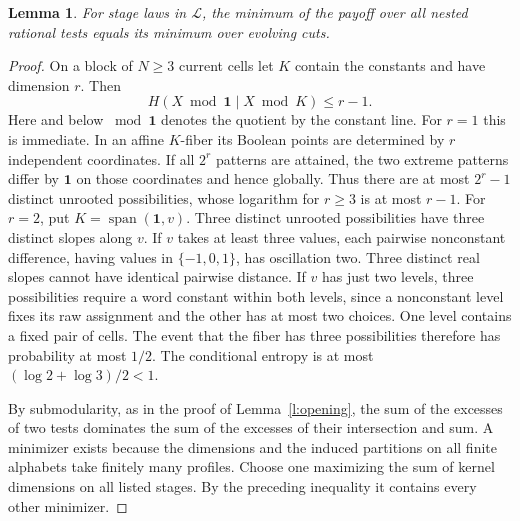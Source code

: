 \documentclass[11pt]{article}
\newtheorem{lemma}[theorem]{Lemma}
\numberwithin{equation}{section}
\newcommand{\one}{\mathbf 1}
\DeclareMathOperator{\spanop}{span}
\begin{document}
\begin{lemma}\label{l:cutmin}
For stage laws in $\mathcal L$, the minimum of the payoff over all
nested rational tests equals its minimum over evolving cuts.
\end{lemma}
\begin{proof}
On a block of $N\ge3$ current cells let $K$ contain the constants
and have dimension $r$. Then
\begin{equation}
 H(X\bmod\one\mid X\bmod K)\le r-1 . \label{e:fiber}
\end{equation}
Here and below $\bmod\one$ denotes the quotient by the constant line.
For $r=1$ this is immediate. In an affine $K$-fiber its Boolean
points are determined by $r$ independent coordinates. If all
$2^r$ patterns are attained, the two extreme patterns differ by
$\one$ on those coordinates and hence globally. Thus there are at
most $2^r-1$ distinct unrooted possibilities, whose logarithm
for $r\ge3$ is at most $r-1$. For $r=2$, put $K=\spanop(\one,v)$.
Three distinct unrooted possibilities have three distinct slopes
along $v$. If $v$ takes at least three values, each pairwise
nonconstant difference, having values in $\{-1,0,1\}$, has
oscillation two. Three distinct real slopes cannot have identical
pairwise distance. If $v$ has just two levels, three possibilities
require a word constant within both levels, since a nonconstant
level fixes its raw assignment and the other has at most two choices.
One level contains a fixed pair of cells. The event that the fiber
has three possibilities therefore has probability at most $1/2$.
The conditional entropy is at most $(\log2+\log3)/2<1$.

By submodularity, as in the proof of Lemma~\ref{l:opening}, the sum
of the excesses of two tests dominates the sum of the excesses of
their intersection and sum. A minimizer exists because
the dimensions and the induced partitions on all finite alphabets
take finitely many profiles. Choose one maximizing the sum of
kernel dimensions on all listed stages. By the preceding inequality
it contains every other minimizer.


\end{proof}
\end{document}
